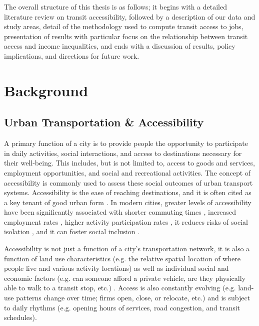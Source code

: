 \documentclass[11 pt, letterpaper]{article}
\begin{document}
{The overall structure of this thesis is as follows; it begins with a detailed literature review on transit accessibility, followed by a description of our data and study areas, detail of the methodology used to compute transit access to jobs, presentation of results with particular focus on the relationship between transit access and income inequalities, and ends with a discussion of results, policy implications, and directions for future work.





\newpage

\section{Background}

\subsection{Urban Transportation \& Accessibility}

A primary function of a city is to provide people the opportunity to participate in daily activities, social interactions, and access to destinations necessary for their well-being. This includes, but is not limited to, access to goods and services, employment opportunities, and social and recreational activities. The concept of accessibility is commonly used to assess these social outcomes of urban transport systems. Accessibility is the ease of reaching destinations, and it is often cited as a key tenant of good urban form \cite{lynch1984}. In modern cities, greater levels of accessibility have been significantly associated with shorter commuting times \cite{kawabata2007}, increased employment rates \cite{merlin2017}, higher activity participation rates , it reduces risks of social isolation \cite{garrett1999}, and it can foster social inclusion \cite{lucas2012}.

Accessibility is not just a function of a city's transportation network, it is also a function of land use characteristics (e.g. the relative spatial location of where people live and various activity locations) as well as individual social and economic factors (e.g. can someone afford a private vehicle, are they physically able to walk to a transit stop, etc.) \cite{hanson1982, geurs2004}. Access is also constantly evolving (e.g. land-use patterns change over time; firms open, close, or relocate, etc.) and is subject to daily rhythms (e.g. opening hours of services, road congestion, and transit schedules).

}
\end{document}
